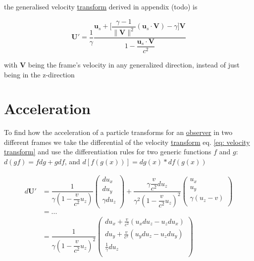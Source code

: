 the generalised velocity \hyperlink{def-transform}{transform} derived in appendix (todo) is

\begin{equation}
	\mathbf{U}' = \dfrac{1}{{\gamma}} \dfrac{\mathbf{u}_s + \Big[\dfrac{{\gamma}-1}{\|\mathbf{V}\|^2}(\mathbf{u}_s\cdot \mathbf{V})- {\gamma} \Big] \mathbf{V}}{1 - \dfrac{\mathbf{u}_s\cdot\mathbf{V}}{c^2}}
\end{equation}

with $\mathbf{V}$ being the frame's velocity in any generalized direction, instead of just being in the z-direction

\section{Acceleration}

To find how the acceleration of a particle transforms for an \hyperlink{def-observer}{observer} in two different frames we take the differential of the velocity \hyperlink{def-transform}{transform} eq. \eqref{eq: velocity transform} and use the differentiation rules for two generic functions $f$ and $g$: $d(gf)=f dg+g df$, and $d[f(g(x))]= dg(x) * df(g(x))$

\begin{equation}
	\begin{aligned}
		d\mathbf{U}' & = \dfrac{1}{{\gamma}\left(1- \dfrac{v}{c^2} u_z\right) }
		\begin{pmatrix}
			du_x          \\
			du_y          \\
			{\gamma} du_z \\
		\end{pmatrix}
		+ \dfrac{{\gamma} \dfrac{v}{c^2} du_z}{{\gamma}^2\left(1- \dfrac{v}{c^2} u_z\right)^2 }
		\begin{pmatrix}
			u_x                             \\
			u_y                             \\
			{\gamma} \left( u_z - v \right) \\
		\end{pmatrix}                                           \\
		             & = ...                                                      \\
		             & = \dfrac{1}{{\gamma}\left(1- \dfrac{v}{c^2} u_z\right)^2 }
		\begin{pmatrix}
			du_x + \frac{v}{c^2}( u_x du_z - u_z du_x) \\
			du_y + \frac{v}{c^2}( u_y du_z - u_z du_y) \\
			\frac{1}{{\gamma}} du_z                    \\
		\end{pmatrix}
	\end{aligned}
\end{equation}

